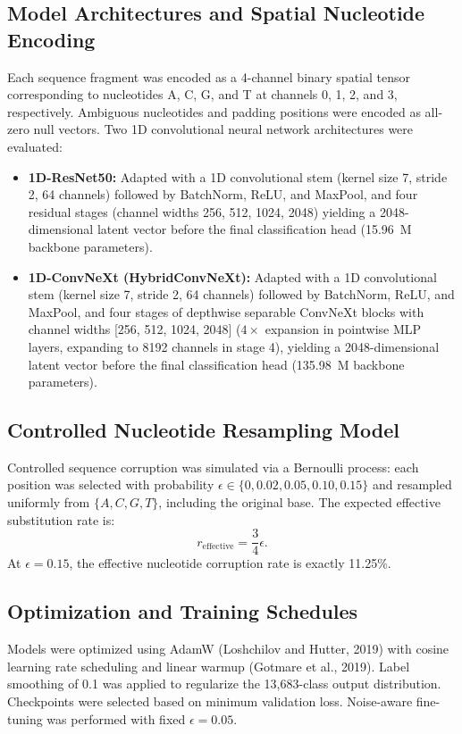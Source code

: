 \documentclass[11pt,a4paper]{article}
\begin{document}
\subsection{Model Architectures and Spatial Nucleotide Encoding}
Each sequence fragment was encoded as a 4-channel binary spatial tensor corresponding to nucleotides A, C, G, and T at channels 0, 1, 2, and 3, respectively. Ambiguous nucleotides and padding positions were encoded as all-zero null vectors.
Two 1D convolutional neural network architectures were evaluated:
\begin{itemize}
\item \textbf{1D-ResNet50:} Adapted with a 1D convolutional stem (kernel size 7, stride 2, 64 channels) followed by BatchNorm, ReLU, and MaxPool, and four residual stages (channel widths 256, 512, 1024, 2048) yielding a 2048-dimensional latent vector before the final classification head (15.96~M backbone parameters).
\item \textbf{1D-ConvNeXt (HybridConvNeXt):} Adapted with a 1D convolutional stem (kernel size 7, stride 2, 64 channels) followed by BatchNorm, ReLU, and MaxPool, and four stages of depthwise separable ConvNeXt blocks with channel widths [256, 512, 1024, 2048] ($4\times$ expansion in pointwise MLP layers, expanding to 8192 channels in stage 4), yielding a 2048-dimensional latent vector before the final classification head (135.98~M backbone parameters).
\end{itemize}




\subsection{Controlled Nucleotide Resampling Model}
Controlled sequence corruption was simulated via a Bernoulli process: each position was selected with probability $\epsilon \in \{0, 0.02, 0.05, 0.10, 0.15\}$ and resampled uniformly from $\{A, C, G, T\}$, including the original base. The expected effective substitution rate is:
\begin{equation}
r_{\text{effective}} = \frac{3}{4} \epsilon.
\end{equation}
At $\epsilon=0.15$, the effective nucleotide corruption rate is exactly 11.25\%.



\subsection{Optimization and Training Schedules}
Models were optimized using AdamW (Loshchilov and Hutter, 2019) with cosine learning rate scheduling and linear warmup (Gotmare et al., 2019). Label smoothing of 0.1 was applied to regularize the 13,683-class output distribution. Checkpoints were selected based on minimum validation loss. Noise-aware fine-tuning was performed with fixed $\epsilon=0.05$.
\end{document}
